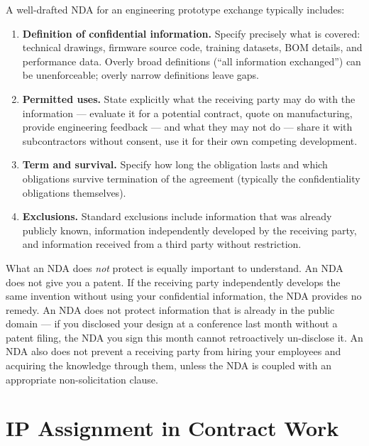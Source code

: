 A well-drafted NDA for an engineering prototype exchange typically includes:
\begin{enumerate}
  \item \textbf{Definition of confidential information.}
        Specify precisely what is covered: technical drawings, firmware source
        code, training datasets, BOM details, and performance data.
        Overly broad definitions (``all information exchanged'') can be
        unenforceable; overly narrow definitions leave gaps.
  \item \textbf{Permitted uses.}
        State explicitly what the receiving party may do with the information
        --- evaluate it for a potential contract, quote on manufacturing, provide
        engineering feedback --- and what they may not do --- share it with
        subcontractors without consent, use it for their own competing development.
  \item \textbf{Term and survival.}
        Specify how long the obligation lasts and which obligations survive
        termination of the agreement (typically the confidentiality obligations
        themselves).
  \item \textbf{Exclusions.}
        Standard exclusions include information that was already publicly known,
        information independently developed by the receiving party, and information
        received from a third party without restriction.
\end{enumerate}

What an NDA does \emph{not} protect is equally important to understand.
An NDA does not give you a patent.
If the receiving party independently develops the same invention without using your
confidential information, the NDA provides no remedy.
An NDA does not protect information that is already in the public domain --- if
you disclosed your design at a conference last month without a patent filing, the
NDA you sign this month cannot retroactively un-disclose it.
An NDA also does not prevent a receiving party from hiring your employees and
acquiring the knowledge through them, unless the NDA is coupled with an
appropriate non-solicitation clause.

\section{IP Assignment in Contract Work}
\label{sec:ch15-contract}

